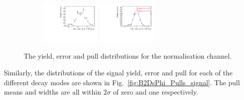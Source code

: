 \begin{figure}[!h]
\begin{subfigure}[t]{1.0\textwidth}
      \includegraphics[width=0.32\textwidth]{figs/B2DsPhi/Plots_DsKK_Error_yield_peak_DsD0_Ds2KPiPi_toy_both_DsBDTbin1_PhiBDTbin1_both_both.pdf}
      \includegraphics[width=0.32\textwidth]{figs/B2DsPhi/Plots_DsKK_Pull_yield_peak_DsD0_Ds2KPiPi_toy_both_DsBDTbin1_PhiBDTbin1_both_both.pdf}
      \caption{\decay{\Dsp}{\Kp\pim\pip}}
   \end{subfigure}

   \caption{The yield, error and pull distributions for the normalisation channel.}
   \label{fig:B2DsPhi_Pulls_normalisation}
\end{figure}


Similarly, the distributions of the signal yield, error and pull for each of the different \Dsp decay modes are shown in Fig.~\ref{fig:B2DsPhi_Pulls_signal}. The pull means and widths are all within $2\sigma$ of zero and one respectively.


